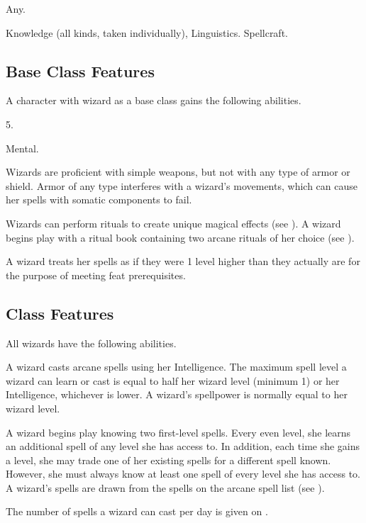  Any.

 Knowledge (all kinds, taken individually), Linguistics.
 Spellcraft.

\subsection{Base Class Features}
A character with wizard as a base class gains the following abilities.

 5.

  Mental.

Wizards are proficient with simple weapons, but not with any type of armor or shield.
Armor of any type interferes with a wizard's movements, which can cause her spells with somatic components to fail.

Wizards can perform rituals to create unique magical effects (see ).
A wizard begins play with a ritual book containing two arcane rituals of her choice (see ).

A wizard treats her spells as if they were 1 level higher than they actually are for the purpose of meeting feat prerequisites.

\subsection{Class Features}
All wizards have the following abilities.

A wizard casts arcane spells using her Intelligence.
The maximum spell level a wizard can learn or cast is equal to half her wizard level (minimum 1) or her Intelligence, whichever is lower.
A wizard's spellpower is normally equal to her wizard level.

A wizard begins play knowing two first-level spells.
Every even level, she learns an additional spell of any level she has access to.
In addition, each time she gains a level, she may trade one of her existing spells for a different spell known.
However, she must always know at least one spell of every level she has access to.
A wizard's spells are drawn from the spells on the arcane spell list (see ).

The number of spells a wizard can cast per day is given on .

